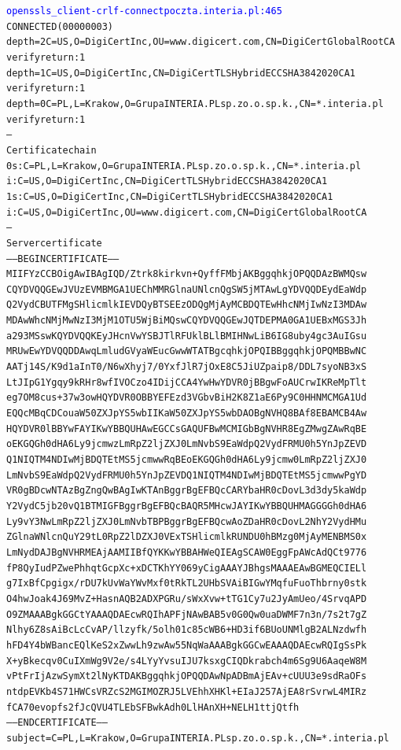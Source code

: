 \begin{enumerate}[label=\textbf{6.\arabic*}]
\scriptsize
\begin{alltt}
\textcolor{blue}{openssl s_client -crlf -connect poczta.interia.pl:465}
CONNECTED(00000003)
depth=2 C = US, O = DigiCert Inc, OU = www.digicert.com, CN = DigiCert Global Root CA
verify return:1
depth=1 C = US, O = DigiCert Inc, CN = DigiCert TLS Hybrid ECC SHA384 2020 CA1
verify return:1
depth=0 C = PL, L = Krakow, O = Grupa INTERIA.PL sp. z o.o. sp. k., CN = *.interia.pl
verify return:1
---
Certificate chain
 0 s:C = PL, L = Krakow, O = Grupa INTERIA.PL sp. z o.o. sp. k., CN = *.interia.pl
   i:C = US, O = DigiCert Inc, CN = DigiCert TLS Hybrid ECC SHA384 2020 CA1
 1 s:C = US, O = DigiCert Inc, CN = DigiCert TLS Hybrid ECC SHA384 2020 CA1
   i:C = US, O = DigiCert Inc, OU = www.digicert.com, CN = DigiCert Global Root CA
---
Server certificate
-----BEGIN CERTIFICATE-----
MIIFYzCCBOigAwIBAgIQD/Ztrk8kirkvn+QyffFMbjAKBggqhkjOPQQDAzBWMQsw
CQYDVQQGEwJVUzEVMBMGA1UEChMMRGlnaUNlcnQgSW5jMTAwLgYDVQQDEydEaWdp
Q2VydCBUTFMgSHlicmlkIEVDQyBTSEEzODQgMjAyMCBDQTEwHhcNMjIwNzI3MDAw
MDAwWhcNMjMwNzI3MjM1OTU5WjBiMQswCQYDVQQGEwJQTDEPMA0GA1UEBxMGS3Jh
a293MSswKQYDVQQKEyJHcnVwYSBJTlRFUklBLlBMIHNwLiB6IG8uby4gc3AuIGsu
MRUwEwYDVQQDDAwqLmludGVyaWEucGwwWTATBgcqhkjOPQIBBggqhkjOPQMBBwNC
AATj14S/K9d1aInT0/N6wXhyj7/0YxfJlR7jOxE8C5JiUZpaip8/DDL7syoNB3xS
LtJIpG1Ygqy9kRHr8wfIVOCzo4IDijCCA4YwHwYDVR0jBBgwFoAUCrwIKReMpTlt
eg7OM8cus+37w3owHQYDVR0OBBYEFEzd3VGbvBiH2K8Z1aE6Py9C0HHNMCMGA1Ud
EQQcMBqCDCouaW50ZXJpYS5wbIIKaW50ZXJpYS5wbDAOBgNVHQ8BAf8EBAMCB4Aw
HQYDVR0lBBYwFAYIKwYBBQUHAwEGCCsGAQUFBwMCMIGbBgNVHR8EgZMwgZAwRqBE
oEKGQGh0dHA6Ly9jcmwzLmRpZ2ljZXJ0LmNvbS9EaWdpQ2VydFRMU0h5YnJpZEVD
Q1NIQTM4NDIwMjBDQTEtMS5jcmwwRqBEoEKGQGh0dHA6Ly9jcmw0LmRpZ2ljZXJ0
LmNvbS9EaWdpQ2VydFRMU0h5YnJpZEVDQ1NIQTM4NDIwMjBDQTEtMS5jcmwwPgYD
VR0gBDcwNTAzBgZngQwBAgIwKTAnBggrBgEFBQcCARYbaHR0cDovL3d3dy5kaWdp
Y2VydC5jb20vQ1BTMIGFBggrBgEFBQcBAQR5MHcwJAYIKwYBBQUHMAGGGGh0dHA6
Ly9vY3NwLmRpZ2ljZXJ0LmNvbTBPBggrBgEFBQcwAoZDaHR0cDovL2NhY2VydHMu
ZGlnaWNlcnQuY29tL0RpZ2lDZXJ0VExTSHlicmlkRUNDU0hBMzg0MjAyMENBMS0x
LmNydDAJBgNVHRMEAjAAMIIBfQYKKwYBBAHWeQIEAgSCAW0EggFpAWcAdQCt9776
fP8QyIudPZwePhhqtGcpXc+xDCTKhYY069yCigAAAYJBhgsMAAAEAwBGMEQCIELl
g7IxBfCpgigx/rDU7kUvWaYWvMxf0tRkTL2UHbSVAiBIGwYMqfuFuoThbrny0stk
O4hwJoak4J69MvZ+HasnAQB2ADXPGRu/sWxXvw+tTG1Cy7u2JyAmUeo/4SrvqAPD
O9ZMAAABgkGGCtYAAAQDAEcwRQIhAPFjNAwBAB5v0G0Qw0uaDWMF7n3n/7s2t7gZ
Nlhy6Z8sAiBcLcCvAP/llzyfk/5olh01c85cWB6+HD3if6BUoUNMlgB2ALNzdwfh
hFD4Y4bWBancEQlKeS2xZwwLh9zwAw55NqWaAAABgkGGCwEAAAQDAEcwRQIgSsPk
X+yBkecqv0CuIXmWg9V2e/s4LYyYvsuIJU7ksxgCIQDkrabch4m6Sg9U6AaqeW8M
vPtFrIjAzwSymXt2lNyKTDAKBggqhkjOPQQDAwNpADBmAjEAv+cUUU3e9sdRaOFs
ntdpEVKb4S71HWCsVRZcS2MGIMOZRJ5LVEhhXHKl+EIaJ257AjEA8rSvrwL4MIRz
fCA70evopfs2fJcQVU4TLEbSFBwkAdh0LlHAnXH+NELH1ttjQtfh
-----END CERTIFICATE-----
subject=C = PL, L = Krakow, O = Grupa INTERIA.PL sp. z o.o. sp. k., CN = *.interia.pl


\end{alltt}
\end{enumerate}
